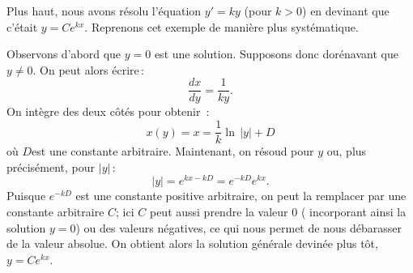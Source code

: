 \begin{example}
Plus haut, nous avons résolu l'équation $y' = ky$ (pour $k > 0$) en devinant que c'était 
$y=Ce^{kx}$.  Reprenons cet exemple de manière plus systématique.

Observons d'abord que  $y=0$ est une solution.  Supposons donc dorénavant que $y\not= 0$.  On peut alors écrire\,: 
\begin{equation*}
\frac{dx}{dy} = \frac{1}{ky} .
\end{equation*}
On intègre des deux côtés pour obtenir \,: 
\begin{equation*}
x(y) = x = \frac{1}{k} \ln \, \lvert y \rvert + D
\end{equation*}
où $D$est une constante arbitraire.
Maintenant, on résoud pour $y$ ou, plus précisément, pour $\lvert y \rvert$\,: 
\begin{equation*}
\lvert y \rvert =
e^{kx-kD} = 
e^{-kD} e^{k x} .
\end{equation*}
Puisque $e^{-kD}$ est une constante positive arbitraire, on peut la remplacer par une constante arbitraire $C$; ici $C$ peut aussi prendre la valeur 0 ( incorporant ainsi la solution $y=0$) ou des valeurs négatives, ce qui nous permet de nous débarasser de la valeur absolue.  On obtient alors la solution générale devinée plus tôt, $y = Ce^{kx}$.
\end{example}

